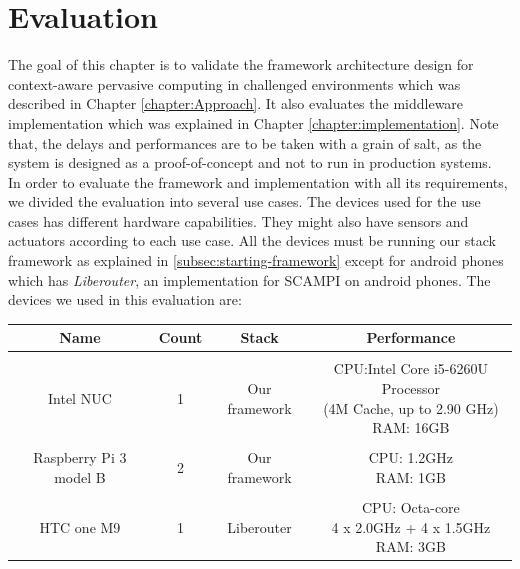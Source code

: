 
\chapter{Evaluation}\label{chapter:Evaluation}

The goal of this chapter is to validate the framework architecture design for context-aware pervasive computing in challenged environments which was described in Chapter \ref{chapter:Approach}. It also evaluates the middleware implementation which was explained in Chapter \ref{chapter:implementation}. Note that, the delays and performances are to be taken with a grain of salt, as the system is designed as a proof-of-concept and not to run in production systems. \\

\noindent In order to evaluate the framework and implementation with all its requirements, we divided the evaluation into several use cases. The devices used for  the use cases has different hardware capabilities. They might also have  sensors and actuators according to each use case. All the devices must be running our stack framework as explained in \ref{subsec:starting-framework} except for android phones which has \textit{Liberouter}, an implementation for SCAMPI on android phones. The devices we used in this evaluation are:
\begin{center}
	\begin{tabular}{ c | c | c| c }
		
		Name & Count & Stack & Performance \\ \hline
		 &  &  &  \\
		Intel NUC &1& 	Our framework &   \specialcell[c]{CPU:Intel Core i5-6260U Processor\\ (4M Cache, up to 2.90 GHz)\\RAM: 16GB }\\ 
		&  &  &  \\
		Raspberry Pi 3 model B & 2 & Our framework &  \specialcell[c]{ CPU: 1.2GHz\\RAM: 1GB}  \\ 
		&  &  &  \\
		HTC one M9 & 1 & Liberouter &   \specialcell[c]{CPU: Octa-core \\4 x 2.0GHz + 4 x 1.5GHz\\ RAM: 3GB} \\ \hline
	\end{tabular}
\end{center}




